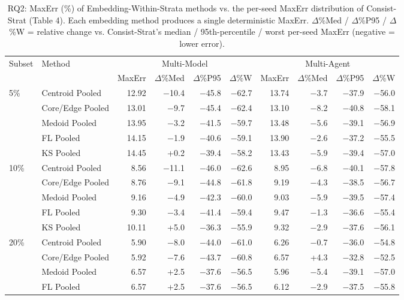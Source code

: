 \begin{table}[t]
\centering
\caption{RQ2: MaxErr (\%) of Embedding-Within-Strata methods vs. the per-seed MaxErr distribution of Consist-Strat (Table 4). Each embedding method produces a single deterministic MaxErr. $\Delta$\%Med / $\Delta$\%P95 / $\Delta$\%W = relative change vs. Consist-Strat's median / 95th-percentile / worst per-seed MaxErr (negative = lower error).}
\label{tab:rq2-maxerr}
\begin{tabular}{llrrrrrrrr}
\toprule
Subset & Method & \multicolumn{4}{c}{Multi-Model} & \multicolumn{4}{c}{Multi-Agent} \\
 &  & MaxErr & $\Delta$\%Med & $\Delta$\%P95 & $\Delta$\%W & MaxErr & $\Delta$\%Med & $\Delta$\%P95 & $\Delta$\%W \\
\midrule
5\% & Centroid Pooled & 12.92 & $-$10.4 & $-$45.8 & $-$62.7 & 13.74 & $-$3.7 & $-$37.9 & $-$56.0 \\
 & Core/Edge Pooled & 13.01 & $-$9.7 & $-$45.4 & $-$62.4 & 13.10 & $-$8.2 & $-$40.8 & $-$58.1 \\
 & Medoid Pooled & 13.95 & $-$3.2 & $-$41.5 & $-$59.7 & 13.48 & $-$5.6 & $-$39.1 & $-$56.9 \\
 & FL Pooled & 14.15 & $-$1.9 & $-$40.6 & $-$59.1 & 13.90 & $-$2.6 & $-$37.2 & $-$55.5 \\
 & KS Pooled & 14.45 & +0.2 & $-$39.4 & $-$58.2 & 13.43 & $-$5.9 & $-$39.4 & $-$57.0 \\
\midrule
10\% & Centroid Pooled & 8.56 & $-$11.1 & $-$46.0 & $-$62.6 & 8.95 & $-$6.8 & $-$40.1 & $-$57.8 \\
 & Core/Edge Pooled & 8.76 & $-$9.1 & $-$44.8 & $-$61.8 & 9.19 & $-$4.3 & $-$38.5 & $-$56.7 \\
 & Medoid Pooled & 9.16 & $-$4.9 & $-$42.3 & $-$60.0 & 9.03 & $-$5.9 & $-$39.5 & $-$57.4 \\
 & FL Pooled & 9.30 & $-$3.4 & $-$41.4 & $-$59.4 & 9.47 & $-$1.3 & $-$36.6 & $-$55.4 \\
 & KS Pooled & 10.11 & +5.0 & $-$36.3 & $-$55.9 & 9.32 & $-$2.9 & $-$37.6 & $-$56.1 \\
\midrule
20\% & Centroid Pooled & 5.90 & $-$8.0 & $-$44.0 & $-$61.0 & 6.26 & $-$0.7 & $-$36.0 & $-$54.8 \\
 & Core/Edge Pooled & 5.92 & $-$7.6 & $-$43.7 & $-$60.8 & 6.57 & +4.3 & $-$32.8 & $-$52.5 \\
 & Medoid Pooled & 6.57 & +2.5 & $-$37.6 & $-$56.5 & 5.96 & $-$5.4 & $-$39.1 & $-$57.0 \\
 & FL Pooled & 6.57 & +2.5 & $-$37.6 & $-$56.5 & 6.12 & $-$2.9 & $-$37.5 & $-$55.8 \\

\end{tabular}
\end{table}
